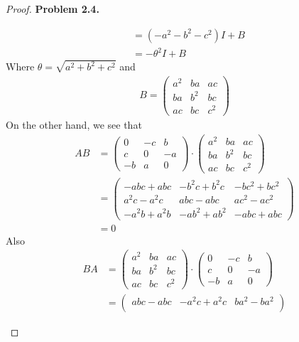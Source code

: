 \documentclass[11pt]{article}
\theoremstyle{definition}
\begin{document}
\begin{proof}{\textbf{Problem 2.4.}}
\begin{itemize}
\begin{align*}
        &= (-a^2-b^2-c^2)I + B\\
        &=-\theta^2I + B
    \end{align*}
    Where $\theta = \sqrt{a^2 + b^2 + c^2}$ and
    \begin{align*}
        B = \begin{pmatrix}
            a^2 & ba & ac\\
            ba & b^2 & bc\\
            ac & bc & c^2
        \end{pmatrix}
    \end{align*}
    On the other hand, we see that
    \begin{align*}
        AB &= \begin{pmatrix}
            0 & -c & b\\
            c & 0 & -a\\
            -b & a & 0
        \end{pmatrix}
        \cdot \begin{pmatrix}
            a^2 & ba & ac\\
            ba & b^2 & bc\\
            ac & bc & c^2
        \end{pmatrix}\\
        &= \begin{pmatrix}
            -abc + abc & -b^2c + b^2c & -bc^2 + bc^2\\
            a^2c - a^2c & abc - abc & ac^2 - ac^2\\
            -a^2b + a^2b & -ab^2 + ab^2 & -abc + abc
        \end{pmatrix}\\
        &= 0
    \end{align*}
    Also
    \begin{align*}
        BA &= \begin{pmatrix}
            a^2 & ba & ac\\
            ba & b^2 & bc\\
            ac & bc & c^2
        \end{pmatrix}
        \cdot \begin{pmatrix}
            0 & -c & b\\
            c & 0 & -a\\
            -b & a & 0
        \end{pmatrix}\\
        &= \begin{pmatrix}
            abc - abc & -a^2c + a^2c & ba^2 - ba^2\\

\end{pmatrix}
\end{align*}
\end{itemize}
\end{proof}
\end{document}
